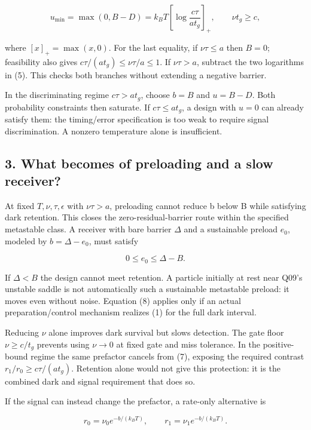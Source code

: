 \documentclass[11pt,a4paper]{article}
\begin{document}
\[u_{\min}=\max(0,B-D)
 =k_BT\left[\log\frac{c\tau}{a t_g}\right]_+,
 \qquad \nu t_g\ge c, \tag{7}\]

where \([x]_+=\max(x,0)\). For the last equality, if \(\nu\tau\le a\)
then \(B=0\); feasibility also gives \(c\tau/(at_g)\le\nu\tau/a\le1\).
If \(\nu\tau>a\), subtract the two logarithms in (5). This checks both
branches without extending a negative barrier.

In the discriminating regime \(c\tau>at_g\), choose \(b=B\) and
\(u=B-D\). Both probability constraints then saturate. If
\(c\tau\le at_g\), a design with \(u=0\) can already satisfy them: the
timing/error specification is too weak to require signal discrimination.
A nonzero temperature alone is insufficient.

\hypertarget{what-becomes-of-preloading-and-a-slow-receiver}{%
\subsection{3. What becomes of preloading and a slow
receiver?}\label{what-becomes-of-preloading-and-a-slow-receiver}}

At fixed \(T,\nu,\tau,\epsilon\) with \(\nu\tau>a\), preloading cannot
reduce b below B while satisfying dark retention. This closes the
zero-residual-barrier route within the specified metastable class. A
receiver with bare barrier \(\Delta\) and a sustainable preload \(e_0\),
modeled by \(b=\Delta-e_0\), must satisfy

\[0\le e_0\le\Delta-B. \tag{8}\]

If \(\Delta<B\) the design cannot meet retention. A particle initially
at rest near Q09's unstable saddle is not automatically such a
sustainable metastable preload: it moves even without noise. Equation
(8) applies only if an actual preparation/control mechanism realizes (1)
for the full dark interval.

Reducing \(\nu\) alone improves dark survival but slows detection. The
gate floor \(\nu\ge c/t_g\) prevents using \(\nu\to0\) at fixed gate and
miss tolerance. In the positive-bound regime the same prefactor cancels
from (7), exposing the required contrast \(r_1/r_0\ge c\tau/(at_g)\).
Retention alone would not give this protection: it is the combined dark
and signal requirement that does so.

If the signal can instead change the prefactor, a rate-only alternative
is

\[r_0=\nu_0 e^{-b/(k_BT)},\qquad
r_1=\nu_1 e^{-b/(k_BT)}. \tag{9}\]
\end{document}
